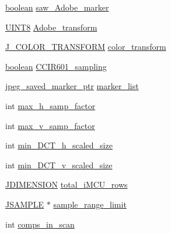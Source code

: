\begin{DoxyCompactItemize}
\item 
\mbox{\hyperlink{jmorecfg_8h_a7c6368b321bd9acd0149b030bb8275ed}{boolean}} \mbox{\hyperlink{structjpeg__decompress__struct_aa117f97eb92feac14f6f91b599f1928c}{saw\+\_\+\+Adobe\+\_\+marker}}
\item 
\mbox{\hyperlink{jmorecfg_8h_adfb9a8ea1dd59f151065f763e1e9acd6}{U\+I\+N\+T8}} \mbox{\hyperlink{structjpeg__decompress__struct_aebe0766b99c4fbe0e8b2a78e5e91d107}{Adobe\+\_\+transform}}
\item 
\mbox{\hyperlink{jpeglib_8h_a26af503ae521188ce89abc2c7adee7f0}{J\+\_\+\+C\+O\+L\+O\+R\+\_\+\+T\+R\+A\+N\+S\+F\+O\+RM}} \mbox{\hyperlink{structjpeg__decompress__struct_a976c199570f66a35853ad08dac014bc3}{color\+\_\+transform}}
\item 
\mbox{\hyperlink{jmorecfg_8h_a7c6368b321bd9acd0149b030bb8275ed}{boolean}} \mbox{\hyperlink{structjpeg__decompress__struct_a57c63b368b579dc76944fe6dba1ecc96}{C\+C\+I\+R601\+\_\+sampling}}
\item 
\mbox{\hyperlink{jpeglib_8h_a2efb5205b3e81589f2dc133f1a412bb0}{jpeg\+\_\+saved\+\_\+marker\+\_\+ptr}} \mbox{\hyperlink{structjpeg__decompress__struct_a28761988a8f06e80619169e09412b27a}{marker\+\_\+list}}
\item 
int \mbox{\hyperlink{structjpeg__decompress__struct_a3c7351d6faa7604cfc60ce3346aa64fa}{max\+\_\+h\+\_\+samp\+\_\+factor}}
\item 
int \mbox{\hyperlink{structjpeg__decompress__struct_ac502831dd72cbe2663eb06f98cf0a489}{max\+\_\+v\+\_\+samp\+\_\+factor}}
\item 
int \mbox{\hyperlink{structjpeg__decompress__struct_a8a89345d171d3f17315c9778cb634e6e}{min\+\_\+\+D\+C\+T\+\_\+h\+\_\+scaled\+\_\+size}}
\item 
int \mbox{\hyperlink{structjpeg__decompress__struct_a91ac3f0ca9c554b1690a0d18bc351762}{min\+\_\+\+D\+C\+T\+\_\+v\+\_\+scaled\+\_\+size}}
\item 
\mbox{\hyperlink{jmorecfg_8h_a04ed4674f6f1d0d50ec241531e38274f}{J\+D\+I\+M\+E\+N\+S\+I\+ON}} \mbox{\hyperlink{structjpeg__decompress__struct_ab210038772e2c74c35b6c0a36db9c6a9}{total\+\_\+i\+M\+C\+U\+\_\+rows}}
\item 
\mbox{\hyperlink{jmorecfg_8h_a552ee7787d3fd8b5f5f5cc3e2145a647}{J\+S\+A\+M\+P\+LE}} $\ast$ \mbox{\hyperlink{structjpeg__decompress__struct_a7208357f11ec6db26e55d7b01d8c7a1b}{sample\+\_\+range\+\_\+limit}}
\item 
int \mbox{\hyperlink{structjpeg__decompress__struct_a2a28db865b9d49bfa9bc6335abf331c3}{comps\+\_\+in\+\_\+scan}}
\item 

\end{DoxyCompactItemize}
